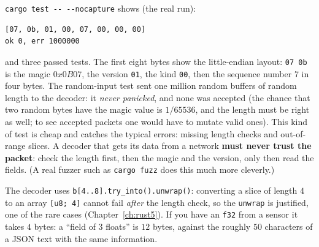 \verb!cargo test -- --nocapture! shows (the real run):
\begin{verbatim}
[07, 0b, 01, 00, 07, 00, 00, 00]
ok 0, err 1000000
\end{verbatim}
and three passed tests. The first eight bytes show the little-endian layout: \verb!07 0b! is the magic $0x0B07$, the version \verb!01!, the kind \verb!00!, then the sequence number $7$ in four bytes. The random-input test sent one million random buffers of random length to the decoder: it \emph{never panicked}, and none was accepted (the chance that two random bytes have the magic value is $1/65536$, and the length must be right as well; to see accepted packets one would have to mutate valid ones). This kind of test is cheap and catches the typical errors: missing length checks and out-of-range slices. A decoder that gets its data from a network \textbf{must never trust the packet}: check the length first, then the magic and the version, only then read the fields. (A real fuzzer such as \verb!cargo fuzz! does this much more cleverly.)

The decoder uses \verb!b[4..8].try_into().unwrap()!: converting a slice of length $4$ to an array \verb![u8; 4]! cannot fail \emph{after} the length check, so the \verb!unwrap! is justified, one of the rare cases (Chapter~\ref{ch:rust5}). If you have an \verb!f32! from a sensor it takes $4$ bytes: a ``field of $3$ floats'' is $12$ bytes, against the roughly $50$ characters of a JSON text with the same information.

